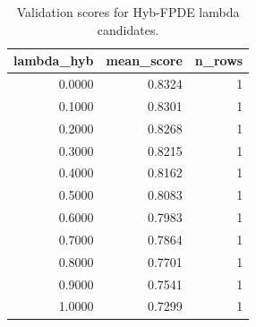 \begin{table}[t]
\caption{Validation scores for Hyb-FPDE lambda candidates.}
\label{tab:lambda_distribution_computed}
\centering
\begin{tabular}{rrr}
\toprule
lambda\_hyb & mean\_score & n\_rows \\
\midrule
0.0000 & 0.8324 & 1 \\
0.1000 & 0.8301 & 1 \\
0.2000 & 0.8268 & 1 \\
0.3000 & 0.8215 & 1 \\
0.4000 & 0.8162 & 1 \\
0.5000 & 0.8083 & 1 \\
0.6000 & 0.7983 & 1 \\
0.7000 & 0.7864 & 1 \\
0.8000 & 0.7701 & 1 \\
0.9000 & 0.7541 & 1 \\
1.0000 & 0.7299 & 1 \\
\bottomrule
\end{tabular}

\end{table}
